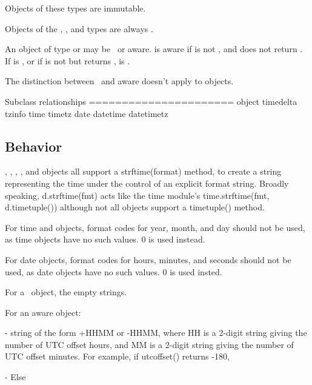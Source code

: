 Objects of these types are immutable.

Objects of the , , and
 types are always \naive.

An object  of type  or    may be
\naive\ or aware.   is aware if  is not ,
and  does not return .  If
 is , or if  is not
 but  returns ,  is
\naive.

The distinction between \naive\ and aware doesn't apply to 
objects.

Subclass relationships
======================
    object
        timedelta
        tzinfo
        time
            timetz
        date
            datetime
                datetimetz



\subsection{ Behavior}

, ,   , , and 
 objects all support
a strftime(format) method, to create a string representing the time
under the control of an explicit format string.  Broadly speaking,
    d.strftime(fmt)
acts like the time module's
    time.strftime(fmt, d.timetuple())
although not all objects support a timetuple() method.

For time and  objects, format codes for year, month, and day
should not be used, as time objects have no such values.  0 is used
instead.

For date objects, format codes for hours, minutes, and seconds should
not be used, as date objects have no such values.  0 is used insted.

For a \naive\ object, the %
empty strings.

For an aware object:

- %
  string of the form +HHMM or -HHMM, where HH is a 2-digit string
  giving the number of UTC offset hours, and MM is a 2-digit string
  giving the number of UTC offset minutes.  For example, if
  utcoffset() returns -180, %

- %
  Else %


